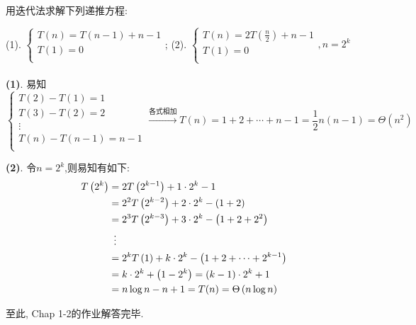 \documentclass{article}
\begin{document}
\pagebreak

\begin{homeworkProblem}
	用迭代法求解下列递推方程: 

	(1). $\begin{cases}
		T\left( n \right) =T\left( n-1 \right) +n-1\\
		T\left( 1 \right) =0\\
	\end{cases}$; \quad (2). $\left\{ \begin{array}{l}
		T\left( n \right) =2T\left( \frac{n}{2} \right) +n-1\\
		T(1)=0\\
	\end{array},n=2^k \right.$
	\\

	\solution
	\\

	\textbf{(1)}. 易知$$\left\{ \begin{array}{c}
		T\left( 2 \right) -T\left( 1 \right) =1\\
		T\left( 3 \right) -T\left( 2 \right) =2\\
		\vdots\\
		T\left( n \right) -T\left( n-1 \right) =n-1\\
	\end{array} \right. \xrightarrow{\text{各式相加}}T\left( n \right) =1+2+\cdots +n-1=\frac{1}{2}n\left( n-1 \right) = \Theta \left(n^2\right)$$

	\textbf{(2)}. 令$n=2^k$,则易知有如下:
	\begin{align}
		T\left( 2^k \right) &=2T\left( 2^{k-1} \right) +1\cdot 2^k-1 \notag
		\\
		&=2^2T\left( 2^{k-2} \right) +2\cdot 2^k-\left( 1+2 \right) \notag
		\\
		&=2^3T\left( 2^{k-3} \right) +3\cdot 2^k-\left( 1+2+2^2 \right) \notag
		\\
		&\,\,\, \vdots \notag
		\\
		&=2^kT\left( 1 \right) +k\cdot 2^k-\left( 1+2+\cdots +2^{k-1} \right) \notag
		\\
		&=k\cdot 2^k+\left( 1-2^k \right) =\left( k-1 \right) \cdot 2^k+1 \notag
		\\
		&=n\log n-n+1=T(n)=\Theta\left( n\log n \right) \notag
	\end{align}
\end{homeworkProblem}

至此, Chap 1-2的作业解答完毕.



\end{document}
